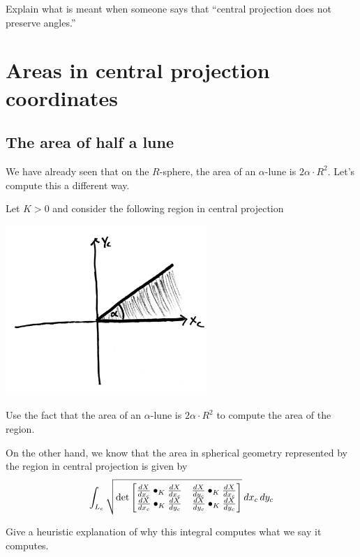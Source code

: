 \documentclass{ximera}
\begin{document}
\begin{problem}
  Explain what is meant when someone says that ``central projection
  does not preserve angles.''
\end{problem}


\section{Areas in central projection coordinates}

\subsection{The area of half a lune}

We have already seen that on the $R$-sphere, the area of an
$\alpha$-lune is $2\alpha\cdot R^2$. Let's compute this a different
way.

\begin{problem}
  Let $K>0$ and consider the following region in central projection
 \begin{image}
   \includegraphics[width=3in]{halfLune.png}
 \end{image}
 Use the fact that the area of an $\alpha$-lune is $2\alpha\cdot R^2$
 to compute the area of the region.
\end{problem}

On the other hand, we know that the area in spherical geometry
represented by the region in central projection is given by
\[
\int_{L_c} \sqrt{
  \det
  \begin{bmatrix}
    \dd[X]{x_c}\bullet_K \dd[X]{x_c} & \dd[X]{y_c}\bullet_K \dd[X]{x_c} \\
    \dd[X]{x_c}\bullet_K \dd[X]{y_c} & \dd[X]{y_c}\bullet_K \dd[X]{y_c}
  \end{bmatrix}
}\d x_c\d y_c
\]

\begin{problem}
  Give a heuristic explanation of why this integral computes what we
  say it computes.
\end{problem}
\end{document}
